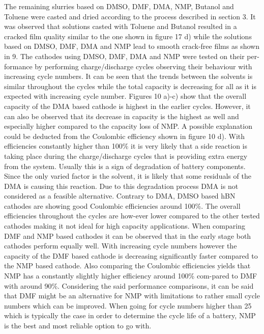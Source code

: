 The remaining slurries based on DMSO, DMF, DMA, NMP, Butanol and Toluene were casted and dried according to the process described in section 3. It was observed that solutions casted with Toluene and Butanol resulted in a
cracked film quality similar to the one shown in figure 17 d) while the solutions based on DMSO, DMF, DMA and NMP lead to smooth crack-free films as shown in 9.
The cathodes using DMSO, DMF, DMA and NMP were tested on their per-formance by performing charge/discharge cycles observing their behaviour with increasing cycle numbers. It can be seen that the trends between the solvents is similar throughout the cycles while the total capacity is decreasing for all as it is expected with increasing cycle number. Figures 10 a)-c) show that the overall capacity of the DMA based cathode is highest in the earlier cycles. However, it can also be observed that its decrease in capacity is the highest as well and especially higher compared to the capacity loss of NMP. A possible explanation could be deducted from the Coulombic eﬃciency shown in figure 10 d). With eﬃciencies constantly higher than 100\% it is very likely that a side reaction is taking place during the charge/discharge cycles that is providing extra energy from the system. Usually this is a sign of degradation of battery components. Since the only varied factor is the solvent, it is likely that some residuals of the DMA is causing this reaction. Due to this degradation process DMA is not considered as a feasible alternative.
Contrary to DMA, DMSO based hBN cathodes are showing good Coulombic eﬃciencies around 100\%. The overall eﬃciencies throughout the cycles are how-ever lower compared to the other tested cathodes making it not ideal for high capacity applications.
When comparing DMF and NMP based cathodes it can be observed that in the early stage both cathodes perform equally well. With increasing cycle numbers however the capacity of the DMF based cathode is decreasing significantly faster compared to the NMP based cathode. Also comparing the Coulombic eﬃciencies yields that NMP has a constantly slightly higher eﬃciency around 100\% com-pared to DMF with around 90\%.
Considering the said performance comparisons, it can be said that DMF might be an alternative for NMP with limitations to rather small cycle numbers which can be improved. When going for cycle numbers higher than 25 which is typically the case in order to determine the cycle life of a battery, NMP is the best and most reliable option to go with. 
